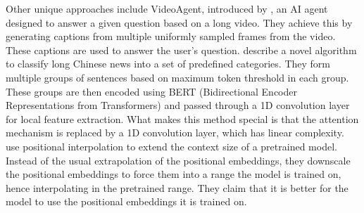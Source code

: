 Other unique approaches include VideoAgent, introduced by \citet{wang2024videoagent}, an
AI agent designed to answer a given question based on a long video.
They achieve this by generating captions from multiple uniformly sampled frames from the
video.
These captions are used to answer the user's question.
\citet{chen2022long} describe a novel algorithm to classify long Chinese news into a set
of predefined categories.
They form multiple groups of sentences based on maximum token threshold in each group.
These groups are then encoded using BERT (Bidirectional Encoder Representations from
Transformers) and passed through a 1D convolution layer for local feature extraction.
What makes this method special is that the attention mechanism is replaced by a 1D
convolution layer, which has linear complexity.
\citet{chen2023extending} use positional interpolation to extend the context size of a
pretrained model.
Instead of the usual extrapolation of the positional embeddings, they downscale the positional
embeddings to force them into a range the model is trained on, hence interpolating in the
pretrained range.
They claim that it is better for the model to use the positional embeddings it is trained on.
